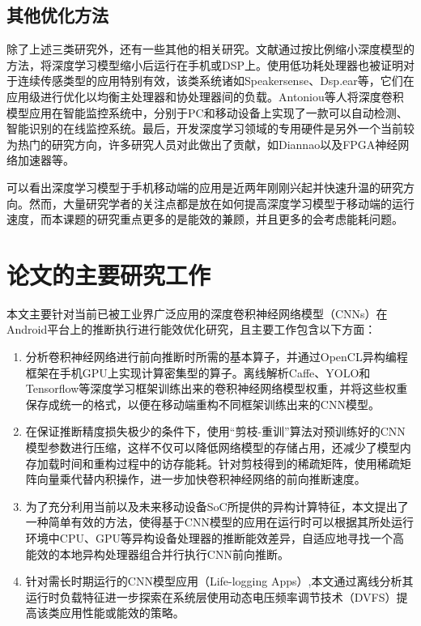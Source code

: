 \subsection{其他优化方法}
除了上述三类研究外，还有一些其他的相关研究。文献\cite{lane2015deepear,chen2014small,variani2014deep}通过按比例缩小深度模型的方法，将深度学习模型缩小后运行在手机或DSP上。使用低功耗处理器也被证明对于连续传感类型的应用特别有效，该类系统诸如Speakersense\cite{lu2011speakersense}、Dsp.ear\cite{georgiev2014dsp}等，它们在应用级进行优化以均衡主处理器和协处理器间的负载。Antoniou等人\cite{antoniou2016general}将深度卷积模型应用在智能监控系统中，分别于PC和移动设备上实现了一款可以自动检测、智能识别的在线监控系统。最后，开发深度学习领域的专用硬件是另外一个当前较为热门的研究方向，许多研究人员对此做出了贡献，如Diannao\cite{chen2014diannao}以及FPGA神经网络加速器\cite{zhang2015optimizing,wang2017dlau,yu2015deep,wang2016solar}等。

可以看出深度学习模型于手机移动端的应用是近两年刚刚兴起并快速升温的研究方向。然而，大量研究学者的关注点都是放在如何提高深度学习模型于移动端的运行速度，而本课题的研究重点更多的是能效的兼顾，并且更多的会考虑能耗问题。

\section{论文的主要研究工作}
本文主要针对当前已被工业界广泛应用的深度卷积神经网络模型（CNNs）在Android平台上的推断执行进行能效优化研究，且主要工作包含以下方面：
\begin{enumerate}
\item 分析卷积神经网络进行前向推断时所需的基本算子，并通过OpenCL异构编程框架在手机GPU上实现计算密集型的算子。离线解析Caffe、YOLO\cite{redmon2016you}和Tensorflow\cite{abadi2016tensorflow}等深度学习框架训练出来的卷积神经网络模型权重，并将这些权重保存成统一的格式，以便在移动端重构不同框架训练出来的CNN模型。
\item 在保证推断精度损失极少的条件下，使用“剪枝-重训”算法对预训练好的CNN模型参数进行压缩，这样不仅可以降低网络模型的存储占用，还减少了模型内存加载时间和重构过程中的访存能耗。针对剪枝得到的稀疏矩阵，使用稀疏矩阵向量乘代替内积操作，进一步加快卷积神经网络的前向推断速度。
\item 为了充分利用当前以及未来移动设备SoC所提供的异构计算特征，本文提出了一种简单有效的方法，使得基于CNN模型的应用在运行时可以根据其所处运行环境中CPU、GPU等异构设备处理器的推断能效差异，自适应地寻找一个高能效的本地异构处理器组合并行执行CNN前向推断。
\item 针对需长时期运行的CNN模型应用（Life-logging Apps）,本文通过离线分析其运行时负载特征进一步探索在系统层使用动态电压频率调节技术（DVFS）\cite{le2010dynamic}提高该类应用性能或能效的策略。
\end{enumerate}

